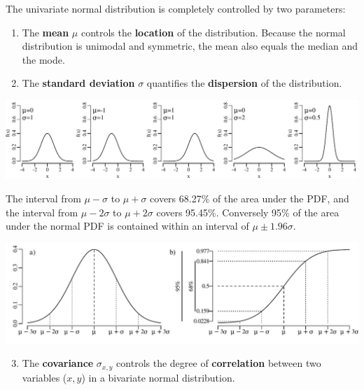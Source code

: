 The univariate normal distribution is completely controlled by two
parameters:

\begin{enumerate}
\item The \textbf{mean} $\mu$ controls the \textbf{location} of the
  distribution.  Because the normal distribution is unimodal and
  symmetric, the mean also equals the median and the mode.
\item The \textbf{standard deviation} $\sigma$ quantifies the
  \textbf{dispersion} of the distribution.
\end{enumerate}

\noindent\includegraphics[width=\textwidth]{../figures/musigma.pdf}
\begingroup {}
\label{fig:musigma}
\endgroup

The interval from $\mu-\sigma$ to $\mu+\sigma$ covers 68.27\% of the
area under the PDF, and the interval from $\mu-2\sigma$ to
$\mu+2\sigma$ covers 95.45\%. Conversely 95\% of the area under the
normal PDF is contained within an interval of $\mu\pm{1.96}\sigma$.

\noindent\includegraphics[width=\textwidth]{../figures/2sigma.pdf}
\begingroup {}
\label{fig:2sigma}
\endgroup

\begin{enumerate}
  \setcounter{enumi}{2}
\item The \textbf{covariance} $\sigma_{x,y}$ controls the degree of
  \textbf{correlation} between two variables ($x,y$) in a bivariate
  normal distribution.
\end{enumerate}

